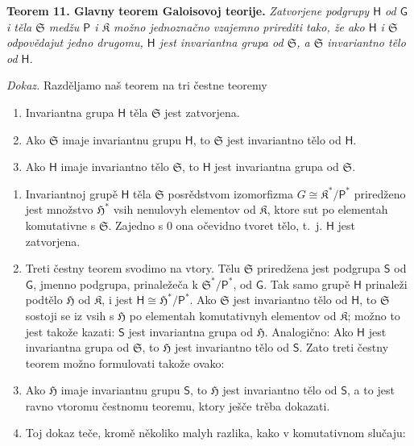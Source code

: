\documentclass[11pt]{article}
\begin{document}
\textbf{Teorem 11. Glavny teorem Galoisovoj teorije.} \emph{Zatvorjene podgrupy \(\mathsf{H}\) od \(\mathsf{G}\) i těla \(\mathfrak S\) medžu \(\mathsf P\) i \(\mathfrak K\) možno jednoznačno vzajemno prirediti tako, že ako \(\mathsf{H}\) i \(\mathfrak S\) odpovědajut jedno drugomu, \(\mathsf{H}\) jest invariantna grupa od \(\mathfrak S\), a \(\mathfrak S\) invariantno tělo od \(\mathsf{H}\).}

\emph{Dokaz.} Razděljamo naš teorem na tri čestne teoremy
\begin{enumerate}
\item Invariantna grupa \(\mathsf{H}\) těla \(\mathfrak S\) jest zatvorjena.
\item Ako \(\mathfrak S\) imaje invariantnu grupu \(\mathsf{H}\), to \(\mathfrak S\) jest invariantno tělo od \(\mathsf{H}\).
\item Ako \(\mathsf{H}\) imaje invariantno tělo \(\mathfrak S\), to \(\mathsf{H}\) jest invariantna grupa od \(\mathfrak S\).
\end{enumerate}

\begin{enumerate}
\item Invariantnoj grupě \(\mathsf{H}\) těla \(\mathfrak S\) posrědstvom izomorfizma \(G\cong \mathfrak K^*/\mathsf P^*\) priredženo jest množstvo \(\mathfrak H^*\) vsih nenulovyh elementov od \(\mathfrak K\), ktore sut po elementah komutativne s \(\mathfrak S\). Zajedno s 0 ona očevidno tvoret tělo, t.~j. \(\mathsf{H}\) jest zatvorjena.

\item Treti čestny teorem svodimo na vtory. Tělu \(\mathfrak S\) priredžena jest podgrupa \(\mathsf{S}\) od \(\mathsf{G}\), jmenno podgrupa, prinaležeča k \(\mathfrak S^*/\mathsf P^*\), od \(\mathsf{G}\). Tak samo grupě \(\mathsf{H}\) prinaleži podtělo \(\mathfrak H\) od \(\mathfrak K\), i jest \(\mathsf{H}\cong \mathfrak H^*/\mathsf P^*\). Ako \(\mathfrak S\) jest invariantno tělo od \(\mathsf{H}\), to \(\mathfrak S\) sostoji se iz vsih s \(\mathfrak H\) po elementah komutativnyh elementov od \(\mathfrak K\); možno to jest takože kazati: \(\mathsf{S}\) jest invariantna grupa od \(\mathfrak H\). Analogično: Ako \(\mathsf{H}\) jest invariantna grupa od \(\mathfrak S\), to \(\mathfrak H\) jest invariantno tělo od \(\mathsf{S}\). Zato treti čestny teorem možno formulovati takože ovako:

\item[\(3'\).] Ako \(\mathfrak H\) imaje invariantnu grupu \(\mathsf{S}\), to \(\mathfrak H\) jest invariantno tělo od \(\mathsf{S}\), a to jest ravno vtoromu čestnomu teoremu, ktory ješče trěba dokazati.

\item[3.] Toj dokaz teče, kromě několiko malyh razlika, kako v komutativnom slučaju:
\end{enumerate}
\end{document}
